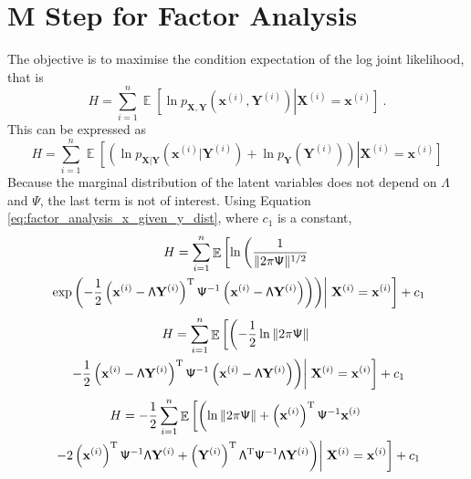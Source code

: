\documentclass[12pt]{report}
\DeclareMathOperator{\expectation}{\mathbb{E}}
\newcommand{\T}{^\textup{T}}
\newcommand{\vect}[1]{\mathbf{#1}}
\newcommand{\matr}[1]{\mathsf{#1}}
\begin{document}
\section{M Step for Factor Analysis}\label{chapter:mStep_factorAnalysis}
The objective is to maximise the condition expectation of the log joint likelihood, that is
\begin{equation*}
H = \sum_{i=1}^{n}\expectation\left[\ln p_{\vect{X},\vect{Y}}\left(\vect{x}^{(i)},\vect{Y}^{(i)}\right)\right|\left.\vect{X}^{(i)}=\vect{x}^{(i)}\right] \ .
\end{equation*}
This can be expressed as
\begin{equation*}
H = \sum_{i=1}^{n}\expectation\left[\left(\ln p_{\vect{X}|\vect{Y}}\left(\vect{x}^{(i)}|\vect{Y}^{(i)}\right)+\ln p_{\vect{Y}}\left(\vect{Y}^{(i)}\right)\right)\right|\left.\vect{X}^{(i)}=\vect{x}^{(i)}
\right]
\end{equation*}
Because the marginal distribution of the latent variables does not depend on $\matr{\Lambda}$ and $\matr{\Psi}$, the last term is not of interest. Using Equation \eqref{eq:factor_analysis_x_given_y_dist}, where $c_1$ is a constant,
\begin{multline*}
H = \sum_{i=1}^{n}\expectation\left[\ln\left(\frac{1}{\|2\pi\matr{\Psi}\|^{1/2}}
\right.\right.
\\
\left.\left.
\exp\left(-\frac{1}{2}\left(\vect{x}^{(i)}-\matr{\Lambda}\vect{Y}^{(i)}\right)\T\matr{\Psi}^{-1}\left(\vect{x}^{(i)}-\matr{\Lambda}\vect{Y}^{(i)}\right)\right)\right)\right|\left.\vect{X}^{(i)}=\vect{x}^{(i)}\vphantom{\frac{1}{1}}
\right]
+c_1
\end{multline*}
\begin{multline*}
H = \sum_{i=1}^{n}\expectation\left[\left(-\frac{1}{2}\ln{\|2\pi\matr{\Psi}\|}
\right.\right.
\\
\left.\left.
-\frac{1}{2}\left(\vect{x}^{(i)}-\matr{\Lambda}\vect{Y}^{(i)}\right)\T\matr{\Psi}^{-1}\left(\vect{x}^{(i)}-\matr{\Lambda}\vect{Y}^{(i)}\right)\right)\right|\left.\vect{X}^{(i)}=\vect{x}^{(i)}\vphantom{\frac{1}{1}}
\right]
+c_1
\end{multline*}
\begin{multline*}
H = -\frac{1}{2}
\sum_{i=1}^{n}\expectation\left[\left(\ln{\|2\pi\matr{\Psi}\|}+\left(\vect{x}^{(i)}\right)\T\matr{\Psi}^{-1}\vect{x}^{(i)}
\right.\right.
\\
\left.\left.
-2\left(\vect{x}^{(i)}\right)\T\matr{\Psi}^{-1}\matr{\Lambda}\vect{Y}^{(i)}+\left(\vect{Y}^{(i)}\right)\T\matr{\Lambda}\T\matr{\Psi}^{-1}\matr{\Lambda}\vect{Y}^{(i)}\right)\right|\left.\vect{X}^{(i)}=\vect{x}^{(i)}\vphantom{\frac{1}{1}}
\right]
+c_1
\end{multline*}
\end{document}
